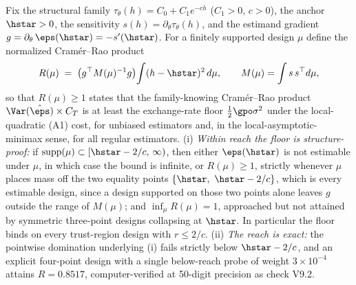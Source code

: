 \begin{theorem}
\label{thm:t9full}
Fix the structural family $\tau_\theta(h) = C_0 + C_1 e^{-ch}$
($C_1 > 0$, $c > 0$), the anchor $\hstar > 0$, the sensitivity
$s(h) = \partial_\theta \tau_\theta(h)$, and the estimand gradient
$g = \partial_\theta\,\eps(\hstar) = -s'(\hstar)$. For a finitely supported
design $\mu$ define the normalized Cram\'er--Rao product
\[
R(\mu) \;=\; \big(g^\top M(\mu)^{-1} g\big)\!\int (h - \hstar)^2\,
d\mu, \qquad M(\mu) = \int s\,s^\top d\mu,
\]
so that $R(\mu) \ge 1$ states that the family-knowing Cram\'er--Rao product
$\Var(\hat\eps)\times C_T$ is at least the exchange-rate floor
$\tfrac{1}{2}\gpo\sigma^2$ under the local-quadratic (A1) cost, for unbiased
estimators and, in the local-asymptotic-minimax sense, for all regular
estimators.
(i) \emph{Within reach the floor is structure-proof:} if
$\mathrm{supp}(\mu) \subset [\hstar - 2/c,\,\infty)$, then either
$\eps(\hstar)$ is not estimable under $\mu$, in which case the bound is
infinite, or $R(\mu) \ge 1$, strictly whenever $\mu$ places mass off the two
equality points $\{\hstar,\ \hstar - 2/c\}$, which is every estimable design,
since a design supported on those two points alone leaves $g$ outside the
range of $M(\mu)$; and $\inf_\mu R(\mu) = 1$,
approached but not attained by symmetric three-point designs collapsing at
$\hstar$. In particular the floor binds on every trust-region design with
$r \le 2/c$.
(ii) \emph{The reach is exact:} the pointwise domination underlying (i) fails
strictly below $\hstar - 2/c$, and an explicit four-point design with a
single below-reach probe of weight $3\times 10^{-4}$ attains $R = 0.8517$,
computer-verified at 50-digit precision as check V9.2.
\end{theorem}
